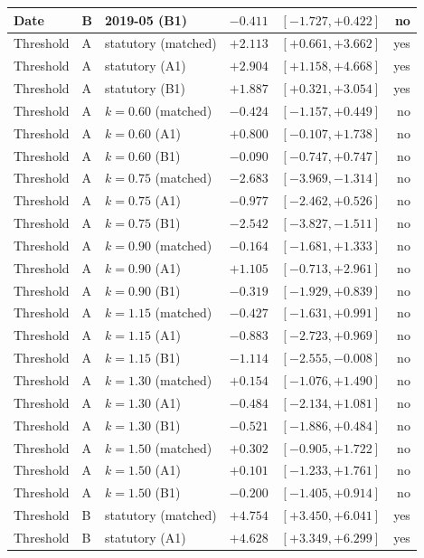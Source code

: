 \begin{table}[H]
\begin{tabular}{lllrrr}
Date & B & 2019-05 (B1) & $-0.411$ & $[-1.727, +0.422]$ & no \\
\midrule
Threshold & A & statutory (matched) & $+2.113$ & $[+0.661, +3.662]$ & yes \\
Threshold & A & statutory (A1) & $+2.904$ & $[+1.158, +4.668]$ & yes \\
Threshold & A & statutory (B1) & $+1.887$ & $[+0.321, +3.054]$ & yes \\
Threshold & A & $k=0.60$ (matched) & $-0.424$ & $[-1.157, +0.449]$ & no \\
Threshold & A & $k=0.60$ (A1) & $+0.800$ & $[-0.107, +1.738]$ & no \\
Threshold & A & $k=0.60$ (B1) & $-0.090$ & $[-0.747, +0.747]$ & no \\
Threshold & A & $k=0.75$ (matched) & $-2.683$ & $[-3.969, -1.314]$ & no \\
Threshold & A & $k=0.75$ (A1) & $-0.977$ & $[-2.462, +0.526]$ & no \\
Threshold & A & $k=0.75$ (B1) & $-2.542$ & $[-3.827, -1.511]$ & no \\
Threshold & A & $k=0.90$ (matched) & $-0.164$ & $[-1.681, +1.333]$ & no \\
Threshold & A & $k=0.90$ (A1) & $+1.105$ & $[-0.713, +2.961]$ & no \\
Threshold & A & $k=0.90$ (B1) & $-0.319$ & $[-1.929, +0.839]$ & no \\
Threshold & A & $k=1.15$ (matched) & $-0.427$ & $[-1.631, +0.991]$ & no \\
Threshold & A & $k=1.15$ (A1) & $-0.883$ & $[-2.723, +0.969]$ & no \\
Threshold & A & $k=1.15$ (B1) & $-1.114$ & $[-2.555, -0.008]$ & no \\
Threshold & A & $k=1.30$ (matched) & $+0.154$ & $[-1.076, +1.490]$ & no \\
Threshold & A & $k=1.30$ (A1) & $-0.484$ & $[-2.134, +1.081]$ & no \\
Threshold & A & $k=1.30$ (B1) & $-0.521$ & $[-1.886, +0.484]$ & no \\
Threshold & A & $k=1.50$ (matched) & $+0.302$ & $[-0.905, +1.722]$ & no \\
Threshold & A & $k=1.50$ (A1) & $+0.101$ & $[-1.233, +1.761]$ & no \\
Threshold & A & $k=1.50$ (B1) & $-0.200$ & $[-1.405, +0.914]$ & no \\
Threshold & B & statutory (matched) & $+4.754$ & $[+3.450, +6.041]$ & yes \\
Threshold & B & statutory (A1) & $+4.628$ & $[+3.349, +6.299]$ & yes \\

\end{tabular}
\end{table}

